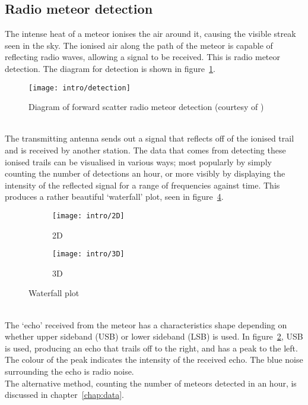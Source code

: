 \subsection{Radio meteor detection}
The intense heat of a meteor ionises the air around it, causing the visible streak seen in the sky. The ionised air along the path of the meteor is capable of reflecting radio waves, allowing a signal to be received. This is radio meteor detection. The diagram for detection is shown in figure~\ref{fig:detection}. 
\begin{figure}
	\centering
	\texttt{[image: intro/detection]}
	\caption{Diagram of forward scatter radio meteor detection (courtesy of \cite{forwardscatter})
		\label{fig:detection}}
\end{figure}\\
The transmitting antenna sends out a signal that reflects off of the ionised trail and is received by another station. The data that comes from detecting these ionised trails can be visualised in various ways; most popularly by simply counting the number of detections an hour, or more visibly by displaying the intensity of the reflected signal for a range of frequencies against time. This produces a rather beautiful `waterfall' plot, seen in figure~\ref{fig:waterfall}. 
\begin{figure}[h!]
	\centering
	\begin{subfigure}{.24\textwidth}
		\texttt{[image: intro/2D]}
		\caption{2D\label{fig:waterfall:a}}
	\end{subfigure}
	\begin{subfigure}{.24\textwidth}
		\texttt{[image: intro/3D]}
		\caption{3D \label{fig:waterfall:b}}
	\end{subfigure}
	\caption{Waterfall plot 
	\label{fig:waterfall}}
\end{figure}\\
The `echo' received from the meteor has a characteristics shape depending on whether upper sideband (USB) or lower sideband (LSB) is used. In figure~\ref{fig:waterfall:a}, USB is used, producing an echo that trails off to the right, and has a peak to the left. The colour of the peak indicates the intensity of the received echo. The blue noise surrounding the echo is radio noise.\\
The alternative method, counting the number of meteors detected in an hour, is discussed in chapter~\ref{chap:data}.

